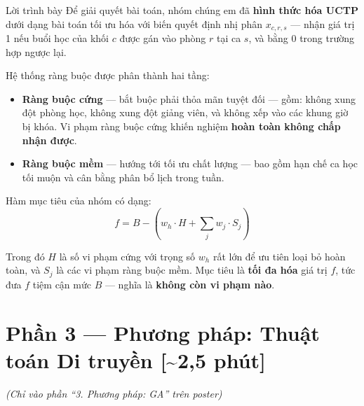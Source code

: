\documentclass[12pt, a4paper]{article}
\begin{document}
\begin{scriptbox}{Lời trình bày}
Để giải quyết bài toán, nhóm chúng em đã \textbf{hình thức hóa UCTP} dưới dạng bài toán tối ưu hóa với biến quyết định nhị phân $x_{c,r,s}$ --- nhận giá trị 1 nếu buổi học của khối $c$ được gán vào phòng $r$ tại ca $s$, và bằng 0 trong trường hợp ngược lại.

\medskip
Hệ thống ràng buộc được phân thành hai tầng:

\begin{itemize}[leftmargin=1.5cm, itemsep=4pt]
  \item \textbf{Ràng buộc cứng} --- bắt buộc phải thỏa mãn tuyệt đối --- gồm: không xung đột phòng học, không xung đột giảng viên, và không xếp vào các khung giờ bị khóa. Vi phạm ràng buộc cứng khiến nghiệm \textbf{hoàn toàn không chấp nhận được}.

  \item \textbf{Ràng buộc mềm} --- hướng tới tối ưu chất lượng --- bao gồm hạn chế ca học tối muộn và cân bằng phân bổ lịch trong tuần.
\end{itemize}

\medskip
Hàm mục tiêu của nhóm có dạng:
\[
  f = B - \left( w_h \cdot H + \sum_{j} w_j \cdot S_j \right)
\]

Trong đó $H$ là số vi phạm cứng với trọng số $w_h$ rất lớn để ưu tiên loại bỏ hoàn toàn, và $S_j$ là các vi phạm ràng buộc mềm. Mục tiêu là \textbf{tối đa hóa} giá trị $f$, tức đưa $f$ tiệm cận mức $B$ --- nghĩa là \textbf{không còn vi phạm nào}.
\end{scriptbox}

\section{Phần 3 — Phương pháp: Thuật toán Di truyền \hfill{\normalfont\color{MidGray}[\textasciitilde{}2,5 phút]}}

\textit{(Chỉ vào phần ``3. Phương pháp: GA'' trên poster)}
\end{document}
